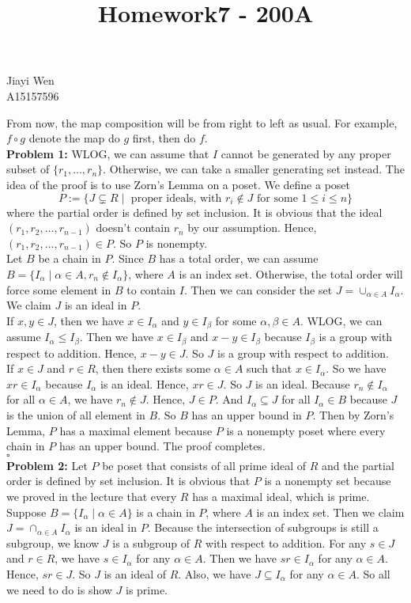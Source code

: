 \documentclass[12pt]{amsart}
\begin{document}
\title{Homework7 - 200A}
\maketitle
\begin{center}
    Jiayi Wen\\
    A15157596
\end{center}
From now, the map composition will be from right to left as usual. For example, $f\circ g$ denote the map do $g$ first, then do $f$.\\
\textbf{Problem 1:} WLOG, we can assume that $I$ cannot be generated by any proper subset of $\{r_1,\dots,r_n\}$. Otherwise, we can take a smaller generating set instead. The idea of the proof is to use Zorn's Lemma on a poset. We define a poset $$P:=\{J\subsetneq R\mid \text{ proper ideals, with } r_i\notin J \text{ for some } 1\leq i\leq n \}$$
where the partial order is defined by set inclusion. It is obvious that the ideal $(r_1,r_2,\dots,r_{n-1})$ doesn't contain $r_n$ by our assumption. Hence, $(r_1,r_2,\dots,r_{n-1})\in P$. So $P$ is nonempty.\\
Let $B$ be a chain in $P$. Since $B$ has a total order, we can assume $B=\{I_\alpha\mid \alpha\in A, r_n\notin I_\alpha\}$, where $A$ is an index set. Otherwise, the total order will force some element in $B$ to contain $I$. Then we can consider the set $J=\cup_{\alpha\in A}I_\alpha$. We claim $J$ is an ideal in $P$.\\
If $x,y\in J$, then we have $x\in I_\alpha$ and $y\in I_\beta$ for some $\alpha,\beta\in A$. WLOG, we can assume $I_\alpha\leq I_\beta$. Then we have $x\in I_\beta$ and $x-y\in I_\beta$ because $I_\beta$ is a group with respect to addition. Hence, $x-y\in J$. So $J$ is a group with respect to addition.\\
If $x\in J$ and $r\in R$, then there exists some $\alpha\in A$ such that $x\in I_\alpha$. So we have $xr\in I_\alpha$ because $I_\alpha$ is an ideal. Hence, $xr\in J$. So $J$ is an ideal. Because $r_n\notin I_\alpha$ for all $\alpha\in A$, we have $r_n\notin J$. Hence, $J\in P$. And $I_\alpha\subseteq J$ for all $I_\alpha\in B$ because $J$ is the union of all element in $B$. So $B$ has an upper bound in $P$. Then by Zorn's Lemma, $P$ has a maximal element because $P$ is a nonempty poset where every chain in $P$ has an upper bound. The proof completes.
\\\phantom{qed}\hfill$\square$\\
\textbf{Problem 2:}
Let $P$ be poset that consists of all prime ideal of $R$ and the partial order is defined by set inclusion. It is obvious that $P$ is a nonempty set because we proved in the lecture that every $R$ has a maximal ideal, which is prime. Suppose $B=\{I_\alpha\mid \alpha\in A\}$ is a chain in $P$, where $A$ is an index set. Then we claim $J=\cap_{\alpha\in A} I_\alpha$ is an ideal in $P$. Because the intersection of subgroups is still a subgroup, we know $J$ is a subgroup of $R$ with respect to addition. For any $s\in J$ and $r\in R$, we have $s\in I_\alpha$ for any $\alpha\in A$. Then we have $sr\in I_\alpha$ for any $\alpha\in A$. Hence, $sr\in J$. So $J$ is an ideal of $R$.  Also, we have $J\subseteq I_\alpha$ for any $\alpha\in A$. So all we need to do is show $J$ is prime.\\
\end{document}
